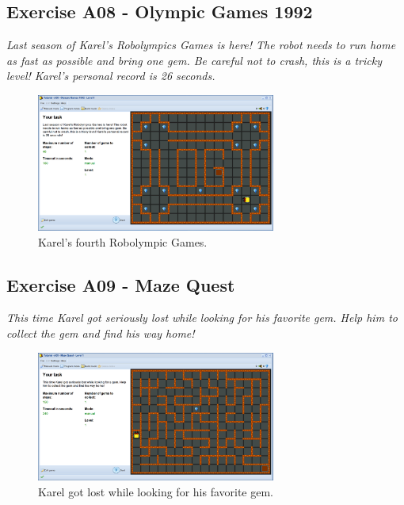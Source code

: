 \documentclass[article,A4,12pt]{llncs}
\begin{document}
\subsection{Exercise A08 - Olympic Games 1992}

{\em Last season of Karel's Robolympics Games is here! The 
robot needs to run home as fast as possible and bring one gem. 
Be careful not to crash, this is a tricky level! Karel's personal record is 26 seconds.}\\[-7mm]

\begin{figure}[!ht]
\begin{center}
\includegraphics[width=0.7\textwidth]{img/a08.png}
\end{center}
\vspace{-4mm}
\caption{Karel's fourth Robolympic Games.}
\label{fig:a08}
\vspace{-4mm}
\end{figure}
\noindent

\subsection{Exercise A09 - Maze Quest}

{\em This time Karel got seriously lost while looking for his favorite gem. 
Help him to collect the gem and find his way home!}\\[-7mm]

\begin{figure}[!ht]
\begin{center}
\includegraphics[width=0.7\textwidth]{img/a09.png}
\end{center}
\vspace{-4mm}
\caption{Karel got lost while looking for his favorite gem.}
\label{fig:a09}
\vspace{-4mm}
\end{figure}
\noindent
\newpage
\end{document}
